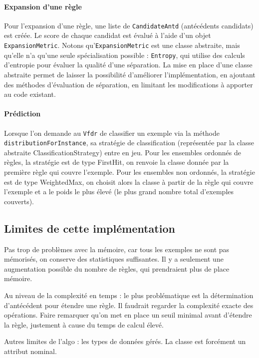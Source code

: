         \paragraph{Expansion d'une règle} Pour l’expansion d’une règle, une liste de \texttt{CandidateAntd} (antécédents candidats) est créée. Le score de chaque candidat est évalué à l’aide d’un objet \texttt{ExpansionMetric}. Notons qu’\texttt{ExpansionMetric} est une classe abstraite, mais qu’elle n’a qu’une seule spécialisation possible : \texttt{Entropy}, qui utilise des calculs d’entropie pour évaluer la qualité d’une séparation. La mise en place d’une classe abstraite permet de laisser la possibilité d’améliorer l’implémentation, en ajoutant des méthodes d’évaluation de séparation, en limitant les modifications à apporter au code existant.
        
        \paragraph{Prédiction} Lorsque l’on demande au \texttt{Vfdr} de classifier un exemple via la méthode \texttt{distributionForInstance}, sa stratégie de classification (représentée par la classe abstraite ClassificationStrategy) entre en jeu. Pour les ensembles ordonnés de règles, la stratégie est de type FirstHit, on renvoie la classe donnée par la première règle qui couvre l’exemple. Pour les ensembles non ordonnés, la stratégie est de type WeightedMax, on choisit alors la classe à partir de la règle qui couvre l’exemple et a le poids le plus élevé (le plus grand nombre total d’exemples couverts).

    \subsection{Limites de cette implémentation}

        Pas trop de problèmes avec la mémoire, car tous les exemples ne sont pas mémorisés, on conserve des statistiques suffisantes. Il y a seulement une augmentation possible du nombre de règles, qui prendraient plus de place mémoire.

        Au niveau de la complexité en temps : le plus problématique est la détermination d’antécédent pour étendre une règle. Il faudrait regarder la complexité exacte des opérations. Faire remarquer qu’on met en place un seuil minimal avant d’étendre la règle, justement à cause du temps de calcul élevé.
        
        Autres limites de l’algo : les types de données gérés. La classe est forcément un attribut nominal.
        
